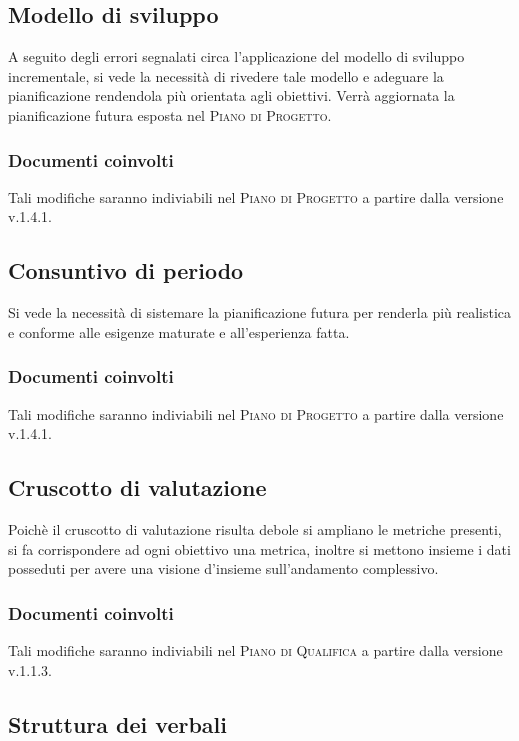 \documentclass{article}
\begin{document}
\subsection{Modello di sviluppo}
\label{itm:2}

A seguito degli errori segnalati circa l'applicazione del modello di sviluppo incrementale, si vede la necessità di rivedere tale modello e adeguare la pianificazione rendendola
più orientata agli obiettivi. Verrà aggiornata la pianificazione futura esposta nel \textsc{Piano di Progetto}.
\subsubsection*{Documenti coinvolti}
Tali modifiche saranno indiviabili nel \textsc{Piano di Progetto} a partire dalla versione v.1.4.1.

\subsection{Consuntivo di periodo}
\label{itm:3}

Si vede la necessità di sistemare la pianificazione futura per renderla più realistica e conforme alle esigenze maturate e all’esperienza fatta.
\subsubsection*{Documenti coinvolti}
Tali modifiche saranno indiviabili nel \textsc{Piano di Progetto} a partire dalla versione v.1.4.1.

\subsection{Cruscotto di valutazione}
\label{itm:4}

Poichè il cruscotto di valutazione risulta debole si ampliano le metriche presenti, si fa corrispondere ad ogni obiettivo una metrica, inoltre
si mettono insieme i dati posseduti per avere una visione d’insieme sull’andamento complessivo.
\subsubsection*{Documenti coinvolti}
Tali modifiche saranno indiviabili nel \textsc{Piano di Qualifica} a partire dalla versione v.1.1.3.

\subsection{Struttura dei verbali}
\label{itm:5}
\end{document}
